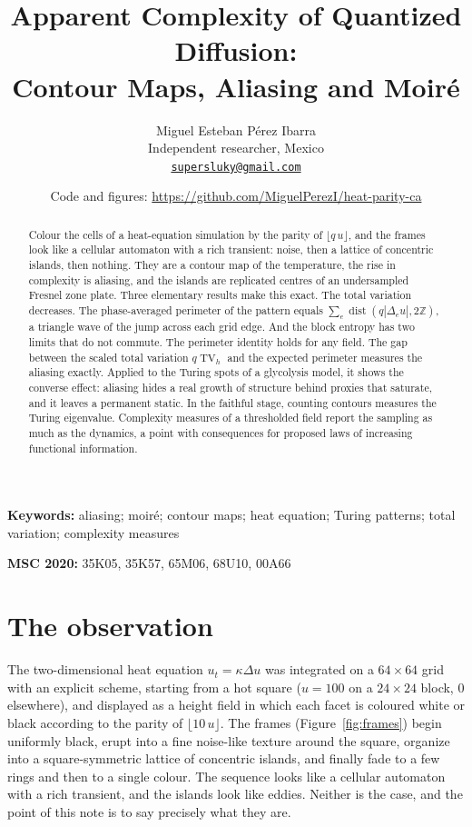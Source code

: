 \documentclass[11pt,a4paper]{article}
\title{Apparent Complexity of Quantized Diffusion:\\
  Contour Maps, Aliasing and Moir\'e}
\author{Miguel Esteban P\'erez Ibarra\\[2pt]
  \small Independent researcher, Mexico\\
  \small \href{mailto:supersluky@gmail.com}{\texttt{supersluky@gmail.com}}}
\date{\small Code and figures: \url{https://github.com/MiguelPerezI/heat-parity-ca}}
\theoremstyle{definition}
\theoremstyle{remark}
\newcommand{\Z}{\mathbb{Z}}
\newcommand{\TV}{\operatorname{TV}}
\DeclareMathOperator{\dist}{dist}
\begin{document}
\maketitle

\begin{abstract}
Colour the cells of a heat-equation simulation by the parity of
$\lfloor q\,u\rfloor$, and the frames look like a cellular automaton
with a rich transient: noise, then a lattice of concentric islands,
then nothing. They are a contour map of the temperature, the rise in
complexity is aliasing, and the islands are replicated centres of an
undersampled Fresnel zone plate. Three elementary results make this
exact. The total variation decreases. The phase-averaged perimeter of
the pattern equals $\sum_e\dist(q|\Delta_eu|,2\Z)$, a triangle wave of
the jump across each grid edge. And the block entropy has two limits
that do not commute. The perimeter identity holds for any field. The gap
between the scaled total variation $q\TV_h$ and the expected perimeter
measures the aliasing exactly. Applied to the Turing spots of a
glycolysis model, it shows the converse effect: aliasing hides a real
growth of structure behind proxies that saturate, and it leaves a
permanent static. In the faithful stage, counting contours measures the
Turing eigenvalue. Complexity measures of a thresholded field report
the sampling as much as the dynamics, a point with consequences for
proposed laws of increasing functional information.
\end{abstract}

\noindent\textbf{Keywords:} aliasing; moir\'e; contour maps; heat
equation; Turing patterns; total variation; complexity measures

\noindent\textbf{MSC 2020:} 35K05, 35K57, 65M06, 68U10, 00A66

\section{The observation}\label{sec:obs}

The two-dimensional heat equation $u_t=\kappa\Delta u$ was integrated on
a $64\times64$ grid with an explicit scheme, starting from a hot square
($u=100$ on a $24\times24$ block, $0$ elsewhere), and displayed as a
height field in which each facet is coloured white or black according to
the parity of $\lfloor 10\,u\rfloor$. The frames (Figure~\ref{fig:frames})
begin uniformly black, erupt into a fine noise-like texture around the
square, organize into a square-symmetric lattice of concentric islands,
and finally fade to a few rings and then to a single colour. The
sequence looks like a cellular automaton with a rich transient, and the
islands look like eddies. Neither is the case, and the point of this
note is to say precisely what they are.
\end{document}
